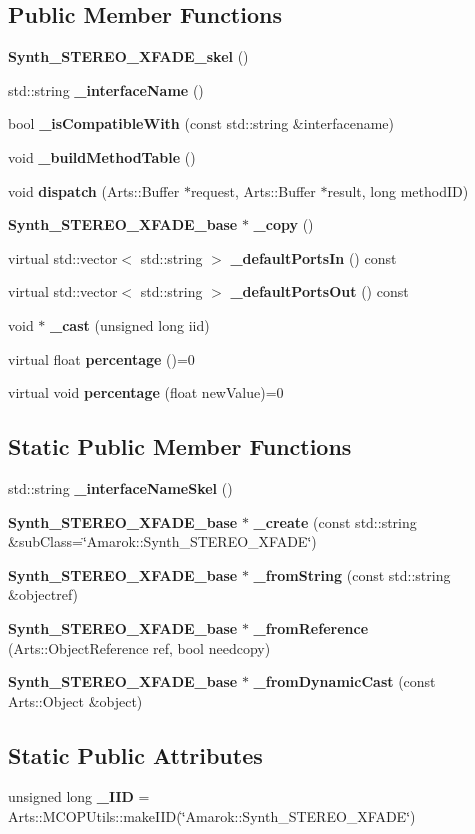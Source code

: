 \subsection*{Public Member Functions}
\begin{CompactItemize}
\item 
{\bf Synth\_\-STEREO\_\-XFADE\_\-skel} ()
\item 
std::string {\bf \_\-interface\-Name} ()
\item 
bool {\bf \_\-is\-Compatible\-With} (const std::string \&interfacename)
\item 
void {\bf \_\-build\-Method\-Table} ()
\item 
void {\bf dispatch} (Arts::Buffer $\ast$request, Arts::Buffer $\ast$result, long method\-ID)
\item 
{\bf Synth\_\-STEREO\_\-XFADE\_\-base} $\ast$ {\bf \_\-copy} ()
\item 
virtual std::vector$<$ std::string $>$ {\bf \_\-default\-Ports\-In} () const 
\item 
virtual std::vector$<$ std::string $>$ {\bf \_\-default\-Ports\-Out} () const 
\item 
void $\ast$ {\bf \_\-cast} (unsigned long iid)
\item 
virtual float {\bf percentage} ()=0
\item 
virtual void {\bf percentage} (float new\-Value)=0
\end{CompactItemize}
\subsection*{Static Public Member Functions}
\begin{CompactItemize}
\item 
std::string {\bf \_\-interface\-Name\-Skel} ()
\item 
{\bf Synth\_\-STEREO\_\-XFADE\_\-base} $\ast$ {\bf \_\-create} (const std::string \&sub\-Class=\char`\"{}Amarok::Synth\_\-STEREO\_\-XFADE\char`\"{})
\item 
{\bf Synth\_\-STEREO\_\-XFADE\_\-base} $\ast$ {\bf \_\-from\-String} (const std::string \&objectref)
\item 
{\bf Synth\_\-STEREO\_\-XFADE\_\-base} $\ast$ {\bf \_\-from\-Reference} (Arts::Object\-Reference ref, bool needcopy)
\item 
{\bf Synth\_\-STEREO\_\-XFADE\_\-base} $\ast$ {\bf \_\-from\-Dynamic\-Cast} (const Arts::Object \&object)
\end{CompactItemize}
\subsection*{Static Public Attributes}
\begin{CompactItemize}
\item 
unsigned long {\bf \_\-IID} = Arts::MCOPUtils::make\-IID(\char`\"{}Amarok::Synth\_\-STEREO\_\-XFADE\char`\"{})
\end{CompactItemize}
